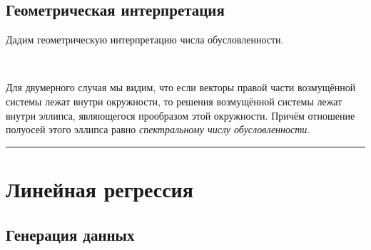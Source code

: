 \documentclass[11pt,a4paper]{article}
\renewcommand{\linethickness}{0.1ex}
\begin{document}
    \hypertarget{ux433ux435ux43eux43cux435ux442ux440ux438ux447ux435ux441ux43aux430ux44f-ux438ux43dux442ux435ux440ux43fux440ux435ux442ux430ux446ux438ux44f}{%
\subsection{Геометрическая
интерпретация}\label{ux433ux435ux43eux43cux435ux442ux440ux438ux447ux435ux441ux43aux430ux44f-ux438ux43dux442ux435ux440ux43fux440ux435ux442ux430ux446ux438ux44f}}

Дадим геометрическую интерпретацию числа обусловленности.


    \begin{center}
    \end{center}
    { \hspace*{\fill} \\}
    
    Для двумерного случая мы видим, что если векторы правой части
возмущённой системы лежат внутри окружности, то решения возмущённой
системы лежат внутри эллипса, являющегося прообразом этой окружности.
Причём отношение полуосей этого эллипса равно \emph{спектральному числу
обусловленности}.

    \begin{center}\rule{0.5\linewidth}{\linethickness}\end{center}

    \hypertarget{ux43fux440ux438ux43cux435ux440-ux43fux43eux43bux438ux43dux43eux43cux438ux430ux43bux44cux43dux430ux44f-ux440ux435ux433ux440ux435ux441ux441ux438ux44f}{%
\section{Линейная
регрессия}\label{ux43fux440ux438ux43cux435ux440-ux43fux43eux43bux438ux43dux43eux43cux438ux430ux43bux44cux43dux430ux44f-ux440ux435ux433ux440ux435ux441ux441ux438ux44f}}

\hypertarget{ux433ux435ux43dux435ux440ux430ux446ux438ux44f-ux434ux430ux43dux43dux44bux445}{%
\subsection{Генерация
данных}\label{ux433ux435ux43dux435ux440ux430ux446ux438ux44f-ux434ux430ux43dux43dux44bux445}}



    \begin{center}
    \end{center}
    { \hspace*{\fill} \\}
    
\end{document}
